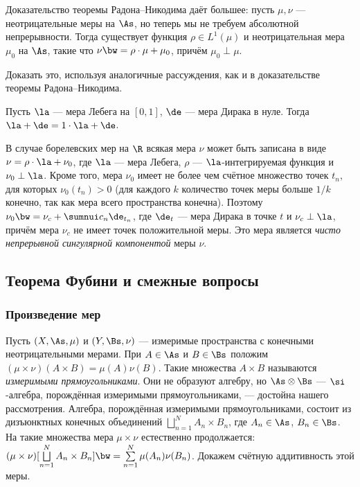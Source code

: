 \documentclass[10pt]{article}
\begin{document}
\begin{note}
Доказательство теоремы Радона--Никодима даёт большее: пусть
$\mu,\nu$ --- неотрицательные меры на $\As$, но теперь мы не требуем
абсолютной непрерывности. Тогда существует функция $\rho\in
L^1(\mu)$ и неотрицательная мера $\mu_0$ на $\As$, такие что $\nu\bw
=\rho\cdot\mu+\mu_0$, причём $\mu_0\perp\mu$.
\end{note}

\begin{problem}
Доказать это, используя аналогичные рассуждения, как и в
доказательстве теоремы Радона--Никодима.
\end{problem}

\begin{ex}
Пусть $\la$ --- мера Лебега на $[0,1]$, $\de$ --- мера Дирака в
нуле. Тогда $\la+\de=1\cdot\la+\de$.
\end{ex}
\begin{note}
В случае борелевских мер на $\R$ всякая мера $\nu$ может быть
записана в виде $\nu=\rho\cdot\la+\nu_0$, где $\la$ --- мера Лебега,
$\rho$ --- $\la$-интегрируемая функция и $\nu_0\perp\la$. Кроме
того, мера $\nu_0$ имеет не более чем счётное множество точек $t_n$,
для которых $\nu_0(t_n)>0$ (для каждого $k$ количество точек меры
больше $1/k$ конечно, так как мера всего пространства конечна).
Поэтому $\nu_0\bw =\nu_c+\sumnui c_n\de_{t_n}$, где $\de_t$ --- мера
Дирака в точке $t$ и $\nu_c\perp\la$, причём мера $\nu_c$ не имеет
точек положительной меры. Это мера является \emph{чисто непрерывной
сингулярной компонентой} меры $\nu$.
\end{note}

\subsection{Теорема Фубини и смежные вопросы}

\subsubsection{Произведение мер}

Пусть $(X,\As,\mu)$ и $(Y,\Bs,\nu)$ --- измеримые пространства с
конечными неотрицательными мерами. При $A\in\As$ и $B\in\Bs$ положим
$(\mu\times\nu)(A\times B)=\mu(A)\nu(B)$. Такие множества $A\times
B$ называются \emph{измеримыми прямоугольниками}. Они не образуют
алгебру, но $\As\otimes\Bs$ --- $\si$-алгебра, порождённая
измеримыми прямоугольниками, --- достойна нашего рассмотрения.
Алгебра, порождённая измеримыми прямоугольниками, состоит из
дизъюнктных конечных объединений $\bigsqcup\limits_{n=1}^NA_n\times
B_n$, где $A_n\in\As$, $B_n\in\Bs$. На такие множества мера
$\mu\times\nu$ естественно продолжается:
$(\mu\times\nu)[\bigsqcup\limits_{n=1}^NA_n\times B_n]\bw
=\sum\limits_{n=1}^N\mu(A_n)\nu(B_n)$. Докажем счётную аддитивность
этой меры.
\end{document}
